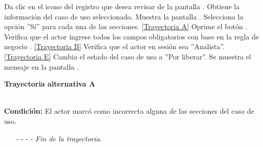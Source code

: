 	\begin{UCtrayectoria}
		\UCpaso[\UCactor] Da clic en el icono  del registro que desea revisar de la pantalla .
		\UCpaso[\UCsist] Obtiene la información del caso de uso seleccionado. 
		\UCpaso[\UCsist] Muestra la pantalla .
		\UCpaso[\UCactor] Selecciona la opción ''Sí'' para cada una de las secciones. \hyperlink{CU12-5:TAA}{[Trayectoria A]} \label{CU12.5-P5}
		\UCpaso[\UCactor] Oprime el botón . \label{CU12.5-P6}
		\UCpaso[\UCsist] Verifica que el actor ingrese todos los campos obligatorios con base en la regla de negocio . \hyperlink{CU12-5:TAB}{[Trayectoria B]}
		\UCpaso[\UCsist] Verifica que el actor en sesión sea ''Analista''. \hyperlink{CU12-5:TAE}{[Trayectoria E]}
		\UCpaso[\UCsist] Cambia el estado del caso de uso a ''Por liberar''.
		\UCpaso[\UCsist] Se muestra el mensaje  en la pantalla . \label{CU12.5-P12}
	\end{UCtrayectoria}		
\hypertarget{CU12-5:TAA}{\textbf{Trayectoria alternativa A}}\\
\noindent \textbf{Condición:} El actor marcó como incorrecta alguna de las secciones del caso de uso.
\begin{enumerate}
	\UCpaso[\UCsist] Muestra el campo correspondiente a las observaciones de aquellas secciones en las que se hayan marcado como incorrecta.
	\UCpaso[\UCactor] Ingresa las observaciones en los campos. \label{CU12.5-TAP2}
	\UCpaso[\UCsist] Verifica que el actor ingrese todos los campos obligatorios con base en la regla de negocio . \hyperlink{CU12-5:TAC}{[Trayectoria C]}
	\UCpaso[\UCsist] Verifica que los datos ingresados cumpla con la longitud correcta, con base en la regla de negocio . \hyperlink{CU12-5:TAC}{[Trayectoria C]}
	\UCpaso[\UCsist] Verifica que los datos ingresados cumplan con el formato requerido, con base en la regla de negocio . \hyperlink{CU12-5:TAD}{[Trayectoria D]}
	\UCpaso[\UCsist] Almacena las observaciones realizadas a cada sección marcada como incorrecta.
	\UCpaso[\UCsist] Cambia el estado del caso de uso a ''Pendiente de corrección''.
	\UCpaso  Continúa en el paso \ref{CU12.5-P12} de la Trayectoria principal.
	\item[- -] - - {\em {Fin de la trayectoria}}.%
\end{enumerate}
